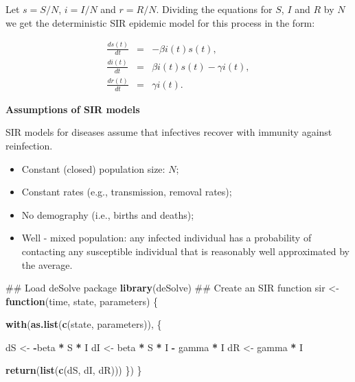 \documentclass[]{book}
\newenvironment{Shaded}{\begin{snugshade}}{\end{snugshade}}
\newcommand{\KeywordTok}[1]{\textcolor[rgb]{0.13,0.29,0.53}{\textbf{#1}}}
\newcommand{\StringTok}[1]{\textcolor[rgb]{0.31,0.60,0.02}{#1}}
\newcommand{\ControlFlowTok}[1]{\textcolor[rgb]{0.13,0.29,0.53}{\textbf{#1}}}
\newcommand{\OperatorTok}[1]{\textcolor[rgb]{0.81,0.36,0.00}{\textbf{#1}}}
\newcommand{\NormalTok}[1]{#1}
\providecommand{\tightlist}{%
  \setlength{\itemsep}{0pt}\setlength{\parskip}{0pt}}
\begin{document}
Let \(s = S / N\), \(i = I / N\) and \(r = R / N\). Dividing the
equations for \(S\), \(I\) and \(R\) by \(N\) we get the deterministic
SIR epidemic model for this process in the form:

\begin{eqnarray*}
\frac{ds(t)}{dt}& = & - \beta i(t)s(t), \\
\frac{di(t)}{dt}& = &\beta i(t)s(t) - \gamma i(t), \\
\frac{dr(t)}{dt}& = &\gamma i(t). 
\end{eqnarray*}

\textbf{Assumptions of SIR models}

SIR models for diseases assume that infectives recover with immunity
against reinfection.

\begin{itemize}
\tightlist
\item
  Constant (closed) population size: \(N\);
\item
  Constant rates (e.g., transmission, removal rates);
\item
  No demography (i.e., births and deaths);
\item
  Well - mixed population: any infected individual has a probability of
  contacting any susceptible individual that is reasonably well
  approximated by the average.
\end{itemize}

\begin{Shaded}
\begin{Highlighting}[]
\NormalTok{## Load deSolve package}
\KeywordTok{library}\NormalTok{(deSolve)}
\NormalTok{## Create an SIR function}
\NormalTok{sir <-}\StringTok{ }\ControlFlowTok{function}\NormalTok{(time, state, parameters) \{}
  
  \KeywordTok{with}\NormalTok{(}\KeywordTok{as.list}\NormalTok{(}\KeywordTok{c}\NormalTok{(state, parameters)), \{}
    
\NormalTok{    dS <-}\StringTok{ }\OperatorTok{-}\NormalTok{beta }\OperatorTok{*}\StringTok{ }\NormalTok{S }\OperatorTok{*}\StringTok{ }\NormalTok{I}
\NormalTok{    dI <-}\StringTok{  }\NormalTok{beta }\OperatorTok{*}\StringTok{ }\NormalTok{S }\OperatorTok{*}\StringTok{ }\NormalTok{I }\OperatorTok{-}\StringTok{ }\NormalTok{gamma }\OperatorTok{*}\StringTok{ }\NormalTok{I}
\NormalTok{    dR <-}\StringTok{                 }\NormalTok{gamma }\OperatorTok{*}\StringTok{ }\NormalTok{I}
    
    \KeywordTok{return}\NormalTok{(}\KeywordTok{list}\NormalTok{(}\KeywordTok{c}\NormalTok{(dS, dI, dR)))}
\NormalTok{  \})}
\NormalTok{\}}
\end{Highlighting}
\end{Shaded}
\end{document}
